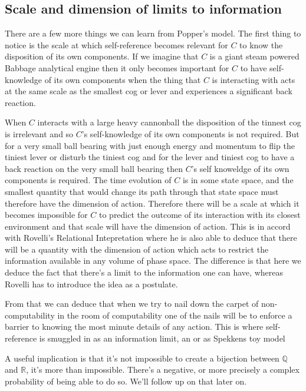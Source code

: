 \documentclass{article}
\begin{document}
\subsection{Scale and dimension of limits to information }
There are a few more things we can learn from Popper's model.  The first thing to notice is the scale at which self-reference becomes relevant for $C$ to know the disposition of its own components. If we imagine that $C$ is a giant steam powered Babbage analytical engine then it only becomes important for $C$ to have self-knowledge of its own components when the thing that $C$ is interacting with acts at the same scale as the smallest cog or lever and experiences a significant back reaction. 

When $C$ interacts with a large heavy cannonball the disposition of the tinnest cog is irrelevant and so $C$'s self-knowledge of its own components is not required. But for a very small ball bearing with just enough energy and momentum to flip the tiniest lever or disturb the tiniest cog and for the lever and tiniest cog to have a back reaction on the very small ball bearing then $C$'s self knoweldge of its own components is required. The time evolution of $C$ is in some state space, and the smallest quantity that would change its path through that state space must therefore have the dimension of action. Therefore there will be a scale at which it becomes impossible for $C$ to predict the outcome of its interaction with its closest environment and that scale will have the dimension of action. This is in accord with Rovelli's Relational Intepretation \autocite{Rovelli1996a} where he is also able to deduce that there will be a quantity with the dimension of action which acts to restrict the information available in any volume of phase space. The difference is that here we deduce the fact that there's a limit to the information one can have, whereas Rovelli has to introduce the idea as a postulate. 

From that we can deduce that when we try to nail down the carpet of non-computability in the room of computability one of the nails will be to enforce a barrier to knowing the most minute details of any action. This is where self-reference is smuggled in as an information limit, an \autocite{szangolies_j_2018, szangolies_2020} or as Spekkens toy model \autocite{spekkens2007toy}

A useful implication is that it's not impossible to create a bijection between $\mathbb{Q}$ and $\mathbb{R}$, it's more than impossible. There's a negative, or more precisely a complex probability of being able to do so. We'll follow up on that later on. 
\end{document}
